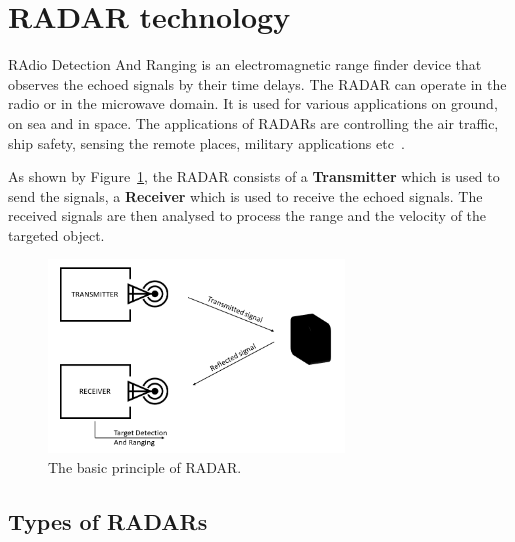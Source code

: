 \section{RADAR technology}
RAdio Detection And Ranging is an electromagnetic range finder device that observes the echoed signals by their time delays.  The RADAR can operate in the radio or in the microwave domain. 
It is used for various applications on ground, on sea and in space. The applications of RADARs are controlling the air traffic, ship safety, sensing the remote places, military applications etc~\cite{RADAR}.

As shown by Figure~\ref{fig:basic_principle}, the RADAR consists of a \textbf{Transmitter} which is used to send the signals, a \textbf{Receiver} which is used to receive the echoed signals.
The received signals are then analysed to process the range and the velocity of the targeted object. 

\begin{figure}[ht]
  \begin{center}
    \includegraphics[width=0.70\textwidth]{Master's thesis/images/basic_block1.png} 
    \caption{The basic principle of RADAR.}
    \label{fig:basic_principle}
  \end{center}
\end{figure}

\subsection{Types of RADARs}

